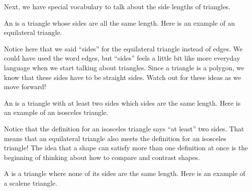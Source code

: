 \documentclass{ximera}
\begin{document}
Next, we have special vocabulary to talk about the side lengths of triangles.

\begin{definition}
	An  is a triangle whose sides are all the same length. Here is an example of an equilateral triangle.
	\begin{image}
	\end{image}
\end{definition}
Notice here that we said ``sides'' for the equilateral triangle instead of edges. We could have used the word edges, but ``sides'' feels a little bit like more everyday language when we start talking about triangles. Since a triangle is a polygon, we know that these sides have to be straight sides. Watch out for these ideas as we move forward!


\begin{definition}
	An  is a triangle with at least two sides which sides are the same length. Here is an example of an isosceles triangle.
	\begin{image}
	\end{image}
\end{definition}
Notice that the definition for an isosceles triangle says ``at least'' two sides. That means that an equilateral triangle also meets the definition for an isosceles triangle! The idea that a shape can satisfy more than one definition at once is the beginning of thinking about how to compare and contrast shapes.

\begin{definition}
	A  is a triangle where none of its sides are the same length. Here is an example of a scalene triangle.
	\begin{image}
	\end{image}
\end{definition}
\end{document}
